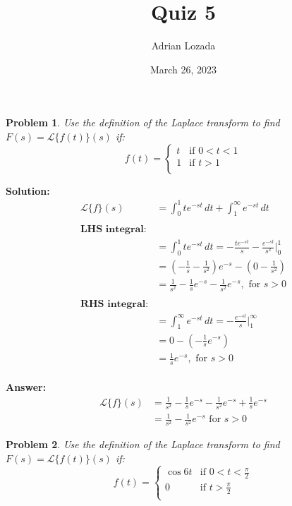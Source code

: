 \documentclass{article}
\title{Quiz 5}
\author{Adrian Lozada}
\date{March 26, 2023}
\newtheorem{problem}{Problem}
\begin{document}
    \maketitle
    \newpage

    \begin{problem}
    Use the definition of the Laplace transform to find $F(s) = \mathcal{L}\{f(t)\}(s)$ if:
    \[
        f(t) = 
        \begin{cases}
            t & \text{if } 0 < t < 1 \\
            1 & \text{if } t > 1 \\
        \end{cases}
    \]
    \end{problem}
    
    \textbf{Solution:} \\
    \begin{align*}
        \mathcal{L}\{f\}(s) &= \int_0^1 te^{-st} \, dt + \int_1^\infty e^{-st} \, dt \\
        \\ %
        \textbf{LHS integral:} \\
        &= \int_0^1 te^{-st} \, dt = -\frac{te^{-st}}{s} - \frac{e^{-st}}{s^2} \Big|_0^1 \\
        &= \left(-\frac{1}{s} - \frac{1}{s^2}\right)e^{-s} - \left(0 - \frac{1}{s^2}\right) \\
        &= \frac{1}{s^2} - \frac{1}{s}e^{-s} - \frac{1}{s^2}e^{-s}, \text{ for } s > 0 \\
        \\ %
        \textbf{RHS integral:} \\
        &= \int_1^\infty e^{-st} \, dt = -\frac{e^{-st}}{s} \Big|_1^\infty \\
        &= 0 - \left(-\frac{1}{s}e^{-s}\right) \\
        &= \frac{1}{s}e^{-s}, \text{ for } s > 0
    \end{align*}
    \\ %
    \textbf{Answer:}
    \begin{align*}
       \mathcal{L}\{f\}(s) &= \frac{1}{s^2} - \frac{1}{s}e^{-s} - \frac{1}{s^2}e^{-s} + \frac{1}{s}e^{-s} \\
       &= \frac{1}{s^2} - \frac{1}{s^2}e^{-s} \text{ for } s > 0
    \end{align*} 

    \newpage
    \begin{problem}
        Use the definition of the Laplace transform to find $F(s) = \mathcal{L}\{f(t)\}(s)$ if:
        \[
            f(t) = 
            \begin{cases}
                \cos{6t} & \text{if } 0 < t < \frac{\pi}{2} \\
                0 & \text{if } t > \frac{\pi}{2} \\
            \end{cases}
        \]
    \end{problem}
    
\end{document}
